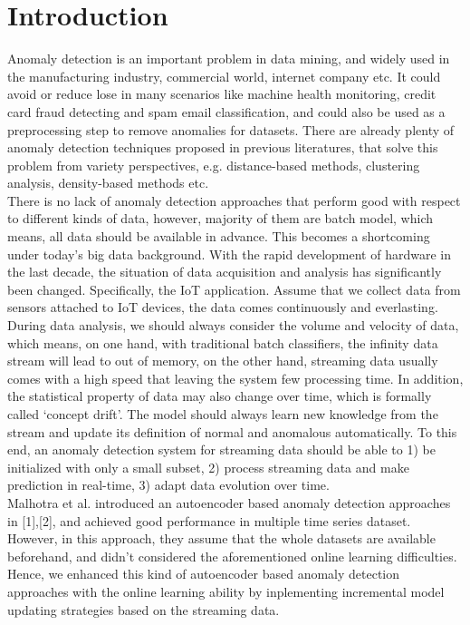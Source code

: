 \chapter{Introduction}
\label{chap:Introduction}

Anomaly detection is an important problem in data mining, and widely used in the manufacturing industry, commercial world, internet company etc. It could avoid or reduce lose in many scenarios like machine health monitoring, credit card fraud detecting and spam email classification, and could also be used as a preprocessing step to remove anomalies for datasets. There are already plenty of anomaly detection techniques proposed in previous literatures, that solve this problem from variety perspectives, e.g. distance-based methods, clustering analysis, density-based methods etc.\\

There is no lack of anomaly detection approaches that perform good with respect to different kinds of data, however, majority of them are batch model, which means, all data should be available in advance. This becomes a shortcoming under today’s big data background. With the rapid development of hardware in the last decade, the situation of data acquisition and analysis has significantly been changed. Specifically, the IoT application. Assume that we collect data from sensors attached to IoT devices, the data comes continuously and everlasting. During data analysis, we should always consider the volume and velocity of data, which means, on one hand, with traditional batch classifiers, the infinity data stream will lead to out of memory, on the other hand, streaming data usually comes with a high speed that leaving the system few processing time. In addition, the statistical property of data may also change over time, which is formally called ‘concept drift’. The model should always learn new knowledge from the stream and update its definition of normal and anomalous automatically. To this end, an anomaly detection system for streaming data should be able to 1) be initialized with only a small subset, 2) process streaming data and make prediction in real-time, 3) adapt data evolution over time.\\

Malhotra et al. introduced an autoencoder based anomaly detection approaches in [1],[2], and achieved good performance in multiple time series dataset. However, in this approach, they assume that the whole datasets are available beforehand, and didn’t considered the aforementioned online learning difficulties. Hence, we enhanced this kind of autoencoder based anomaly detection approaches with the online learning ability by inplementing incremental model updating strategies based on the streaming data.\\


